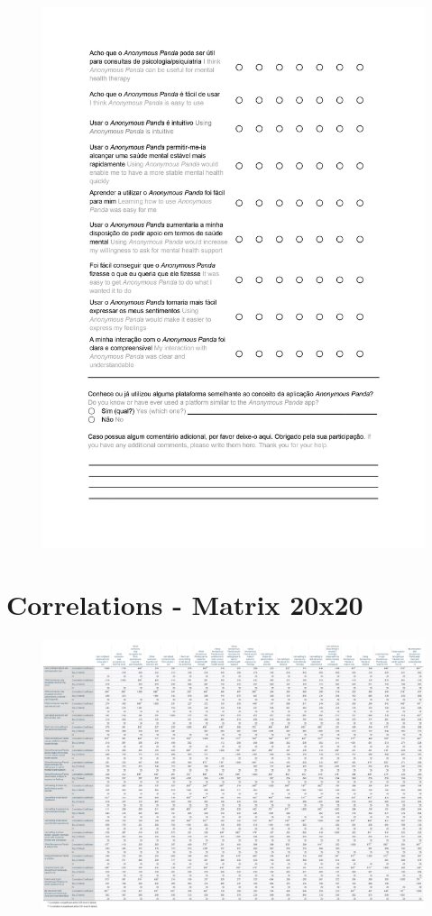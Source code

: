 \begin{figure}[h!]
\centering
\includegraphics[width=\textwidth]{figures/02_04.jpg}
\end{figure}

\clearpage
\section{Correlations - Matrix 20x20}
\label{appendix:correlations}
\begin{figure}[h!]
\centering
\includegraphics[width=1.5\textwidth,angle=90]{figures/correlations.png}
\end{figure}